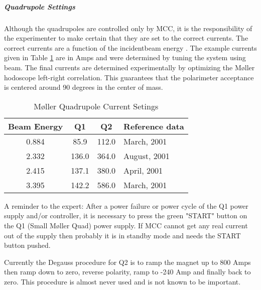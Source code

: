 \subparagraph{Quadrupole Settings}

Although the quadrupoles are controlled only by MCC, it is the 
responsibility of the experimenter to make certain that they are
set to the correct currents.
The correct currents are a function of the incidentbeam energy . The example currents given in Table \ref{tab_qcurrent} are in Amps
and were determined by tuning the system using beam. The final currents 
are determined experimentally by optimizing the
M\o ller hodoscope left-right correlation. This guarantees that the polarimeter
acceptance is centered around 90 degrees in the center of mass.
%
\begin{table}[!hbt]
\begin{center}
\begin{tabular}{|c|c|c|l|} \hline
Beam Energy & Q1  & Q2 &Reference data \\
\hline
0.884 &  85.9 & 112.0 & March, 2001  \\
2.332 & 136.0 & 364.0 & August, 2001 \\
2.415 & 137.1 & 380.0 & April, 2001  \\
3.395 & 142.2 & 586.0 & March, 2001  \\
\hline 
\end{tabular}
\caption{M\o ller Quadrupole Current Setings\label{tab_qcurrent}}
\end{center}
\end{table}

A reminder to the expert: After a power failure or power cycle of the Q1 
power supply and/or controller,
it is necessary to press the green "START" button on the Q1 (Small
M\o ller Quad) power supply.  If MCC cannot get any real current out of the
supply then probably it is in standby mode and needs the START button pushed.

Currently the Degauss procedure for Q2 is to ramp the magnet up to 800 Amps 
then ramp down to zero, reverse polarity, ramp to -240 Amp and finally
back to zero. This procedure is almost never used and is not known to
be important.

